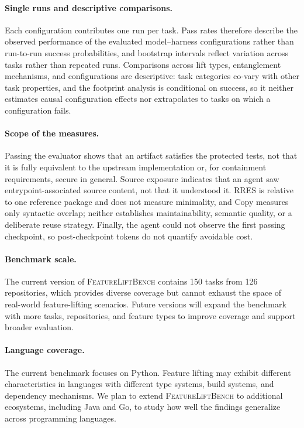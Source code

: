 \documentclass[acmsmall,screen,review,anonymous]{acmart}
\newcommand{\flb}{\textsc{FeatureLiftBench}\xspace}
\begin{document}
\paragraph{Single runs and descriptive comparisons.}
Each configuration contributes one run per task. Pass rates therefore
describe the observed performance of the evaluated model--harness
configurations rather than run-to-run success probabilities, and bootstrap
intervals reflect variation across tasks rather than repeated runs. Comparisons
across lift types, entanglement mechanisms, and configurations are descriptive:
task categories co-vary with other task properties, and the footprint analysis
is conditional on success, so it neither estimates causal configuration effects
nor extrapolates to tasks on which a configuration fails.

\paragraph{Scope of the measures.}
Passing the evaluator shows that an artifact satisfies the protected tests, not
that it is fully equivalent to the upstream implementation or, for containment
requirements, secure in general. Source exposure indicates that an agent saw
entrypoint-associated source content, not that it understood it. RRES is
relative to one reference package and does not measure minimality, and Copy
measures only syntactic overlap; neither establishes maintainability, semantic
quality, or a deliberate reuse strategy. Finally, the agent could not observe
the first passing checkpoint, so post-checkpoint tokens do not quantify
avoidable cost.

\paragraph{Benchmark scale.}
The current version of \flb contains 150 tasks from 126 repositories, which
provides diverse coverage but cannot exhaust the space of real-world feature-lifting
scenarios. Future versions will expand the benchmark with more tasks, repositories,
and feature types to improve coverage and support broader evaluation.

\paragraph{Language coverage.}
The current benchmark focuses on Python. Feature lifting may exhibit different
characteristics in languages with different type systems, build systems, and
dependency mechanisms. We plan to extend \flb to additional ecosystems,
including Java and Go, to study how well the findings generalize across
programming languages.
\end{document}
